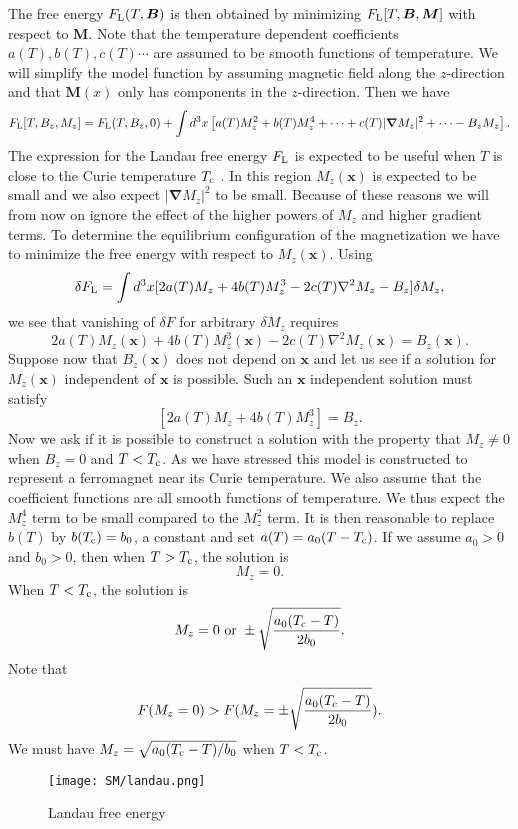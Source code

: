 The free energy $F_{\rm L}(T,\bm{B})$ is then obtained by minimizing $F_{\rm L}[T,\bm{B},\bm{M}]$ with respect to $\bm{M}$. Note that the temperature dependent coefficients $a(T), b(T), c(T) \cdots$ are assumed to be smooth functions of temperature. We will simplify the model function by assuming  magnetic field along the $z$-direction and that $\bm{M}(x)$ only has components in the $z$-direction. Then we have
\[F_{\rm L}[T,B_z,M_z] = F_{\rm L}(T,B_z,0) + \int d^3x \left[ a(T)M_z^2 + b(T)M_z^4 + \cdots + c(T)|\bm{\nabla}M_z|^2 + \cdots - B_z M_z \right].\]
The expression for the Landau free energy $F_{\rm L}$ is expected to be useful when $T$ is close to the Curie temperature $T_{\rm c}$ . In this region $M_z(\bm{x})$ is expected to be small and we also expect $|\bm{\nabla}M_z|^2$ to be small. 
Because of these reasons we will from now on ignore the effect of the higher powers of $M_z$ and higher gradient terms. 
To determine the equilibrium configuration of the magnetization we have to minimize the free energy with respect to $M_z(\bm{x})$. Using
\[\delta F_{\rm L} = \int d^3x [2a(T)M_z + 4b(T)M_z^3 - 2c(T)\nabla^2 M_z - B_z]\delta M_z,\]
we see that vanishing of $\delta F$ for arbitrary $\delta M_z$ requires
\[2a(T)M_z(\bm{x}) + 4b(T)M_z^3(\bm{x}) - 2c(T)\nabla^2M_z(\bm{x}) = B_z(\bm{x}).\]
Suppose now that $B_z(\bm{x})$ does not depend on $\bm{x}$ and let us see if a solution for $M_z(\bm{x})$ independent of $\bm{x}$ is possible. Such an $\bm{x}$ independent solution must satisfy
\[[2a(T)M_z + 4b(T)M_z^3] = B_z.\]
Now we ask if it is possible to construct a solution with the property that $M_z \neq 0$ when $B_z = 0$ and $T < T_{\rm c}$.
As we have stressed this model is constructed to represent a ferromagnet near its Curie temperature. We also assume that the coefficient functions are all smooth functions of temperature. 
We thus expect the $M_z^4$ term to be small compared to the $M_z^2$ term. It is then reasonable to replace $b(T)$ by $b(T_{\rm c}) = b_0$, a constant and set $a(T) = a_0(T-T_{\rm c})$. If we assume $a_0 > 0$ and $b_0 > 0$, then when $T > T_{\rm c}$, the solution is
\[M_z = 0.\]
When $T < T_{\rm c}$, the solution is
\[M_z = 0 \mbox{ or } \pm \sqrt{\frac{a_0(T_{\rm c}-T)}{2b_0}}.\]
Note that
\[F(M_z = 0) > F(M_z = \pm \sqrt{\frac{a_0(T_{\rm c}-T)}{2b_0}}).\]
We must have $M_z = \sqrt{a_0(T_{\rm c}-T)/b_0}$ when $T < T_{\rm c}$.
\begin{figure}[!h]
\centering
\texttt{[image: SM/landau.png]}
\caption{Landau free energy}
\end{figure}
\\
